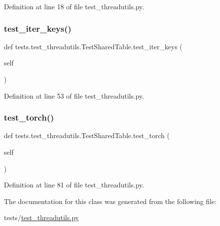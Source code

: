 Definition at line 18 of file test\+\_\+threadutils.\+py.

\mbox{\label{classtests_1_1test__threadutils_1_1TestSharedTable_ad83a5fe7bed1811264f41406c3ec8976}} 
\subsubsection{\texorpdfstring{test\+\_\+iter\+\_\+keys()}{test\_iter\_keys()}}
{\footnotesize\ttfamily def tests.\+test\+\_\+threadutils.\+Test\+Shared\+Table.\+test\+\_\+iter\+\_\+keys (\begin{DoxyParamCaption}\item[{}]{self }\end{DoxyParamCaption})}



Definition at line 53 of file test\+\_\+threadutils.\+py.

\mbox{\label{classtests_1_1test__threadutils_1_1TestSharedTable_a44071985cd8526645fb0f2c41fddbff9}} 
\subsubsection{\texorpdfstring{test\+\_\+torch()}{test\_torch()}}
{\footnotesize\ttfamily def tests.\+test\+\_\+threadutils.\+Test\+Shared\+Table.\+test\+\_\+torch (\begin{DoxyParamCaption}\item[{}]{self }\end{DoxyParamCaption})}



Definition at line 81 of file test\+\_\+threadutils.\+py.



The documentation for this class was generated from the following file\+:\begin{DoxyCompactItemize}
\item 
tests/\hyperlink{test__threadutils_8py}{test\+\_\+threadutils.\+py}\end{DoxyCompactItemize}

